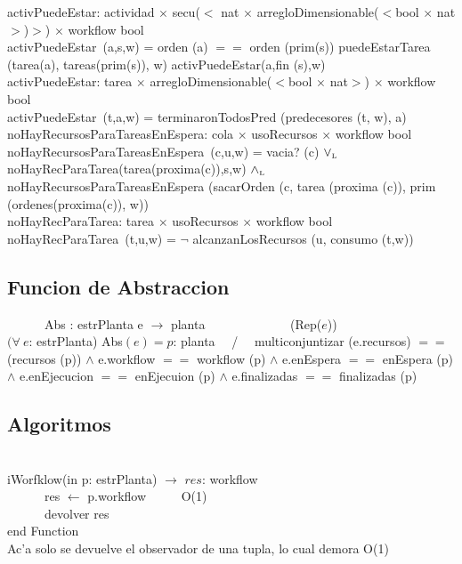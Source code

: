 \documentclass[a4paper,10pt]{article}
\begin{document}
	activPuedeEstar: actividad $\times$ secu($<$ nat $\times$ arregloDimensionable($<$bool $\times$ nat$>$)$>$) $\times$ workflow \en bool\\
	\indent activPuedeEstar\ (a,s,w) =  \lif orden (a) $==$ orden (prim(s)) \lthen puedeEstarTarea (tarea(a), tareas(prim(s)), w) \lelse activPuedeEstar(a,fin (s),w) \\  
	
		activPuedeEstar: tarea $\times$ arregloDimensionable($<$bool $\times$ nat$>$) $\times$ workflow \en bool\\
	\indent activPuedeEstar\ (t,a,w) =  terminaronTodosPred (predecesores (t, w), a)  \\
	

	 
	 noHayRecursosParaTareasEnEspera: cola $\times$ usoRecursos $\times$ workflow \en bool\\
	\indent noHayRecursosParaTareasEnEspera\ (c,u,w) =  vacia? (c) $\lor_{\mathrm{\scriptscriptstyle{L}}}$ noHayRecParaTarea(tarea(proxima(c)),s,w) $\land_{\mathrm{\scriptscriptstyle{L}}}$ noHayRecursosParaTareasEnEspera (sacarOrden (c, tarea (proxima (c)), prim (ordenes(proxima(c)), w)) \\  
	
	 noHayRecParaTarea: tarea $\times$ usoRecursos $\times$ workflow \en bool\\
	\indent noHayRecParaTarea\ (t,u,w) =  $\neg$ alcanzanLosRecursos (u, consumo (t,w)) \\  
	

\subsection{Funcion de Abstraccion}

   \indent \ \ \ \ \ \ Abs : estrPlanta e $\rightarrow$ planta \ \ \ \ \ \ \ \ \ \ \ \ \ (Rep($e$))\\
   
   $(\forall\ e$: estrPlanta) {Abs$(e) = p$: planta} \ \ / \ \ 
multiconjuntizar (e.recursos) $==$ (recursos (p)) $\wedge$ e.workflow $==$ workflow (p) $\wedge$ e.enEspera $==$ enEspera (p) $\wedge$ e.enEjecucion $==$ enEjecuion (p) $\wedge$ e.finalizadas $==$ finalizadas (p)
\newpage
\subsection{Algoritmos}


\begin{algoritmo}
\caption{}\\
  iWorfklow(in p: estrPlanta) $\rightarrow$ $res$: workflow \\
	\indent \ \ \ \ \ \  res $\gets$ p.workflow  \ \ \ \ \ O(1)\\
	\indent \ \ \ \ \ \  devolver res    \\
   end Function \\

Ac'a solo se devuelve el observador de una tupla, lo cual demora O(1)

\end{algoritmo}
\end{document}
